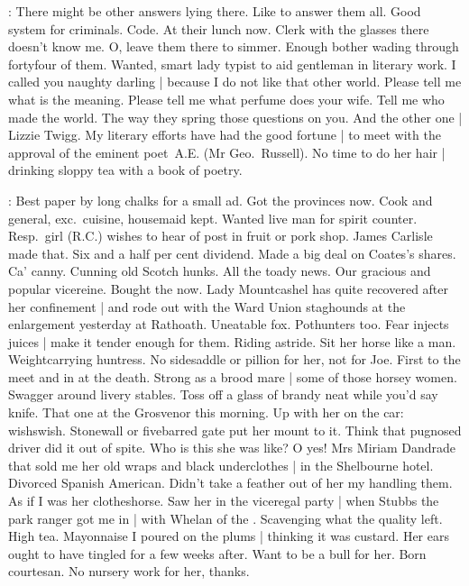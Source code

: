 \BloomInt:
There might be other answers lying there.
Like to answer them all.
Good system for criminals.
Code.
At their lunch now.
Clerk with the glasses there doesn't know me.
O, leave them there to simmer.
Enough bother wading through fortyfour of them.
Wanted,
smart lady typist to aid gentleman in literary work.
I called you naughty darling |
because I do not like that other world.
Please tell me what is the meaning.
Please tell me what perfume does your wife.
Tell me who made the world.
The way they spring those questions on you.
And the other one |
Lizzie Twigg.
My literary efforts have had the good fortune |
to meet with the approval of the eminent poet~A.E.
(Mr Geo.\ Russell).
No time to do her hair |
drinking sloppy tea with a book of poetry.

\BloomInt:
Best paper by long chalks for a small ad.
Got the provinces now.
Cook and general,
exc.\ cuisine,
housemaid kept.
Wanted live man for spirit counter.
Resp.\ girl (R.C.) wishes to hear of post in fruit or pork shop.
James Carlisle made that.
Six and a half per cent dividend.
Made a big deal on Coates's shares.
Ca' canny.
Cunning old Scotch hunks.
All the toady news.
Our gracious and popular vicereine.
Bought the  now.
Lady Mountcashel has quite recovered after her confinement |
and rode out with the Ward Union staghounds
at the enlargement yesterday at Rathoath.
Uneatable fox.
Pothunters too.
Fear injects juices |
make it tender enough for them.
Riding astride.
Sit her horse like a man.
Weightcarrying huntress.
No sidesaddle or pillion for her,
not for Joe.
First to the meet and in at the death.
Strong as a brood mare |
some of those horsey women.
Swagger around livery stables.
Toss off a glass of brandy neat while you'd say knife.
That one at the Grosvenor this morning.
Up with her on the car:
wishswish.
Stonewall or fivebarred gate put her mount to it.
Think that pugnosed driver did it out of spite.
Who is this she was like?
O yes!
Mrs Miriam Dandrade that sold me
her old wraps and black underclothes |
in the Shelbourne hotel.
Divorced Spanish American.
Didn't take a feather out of her my handling them.
As if I was her clotheshorse.
Saw her in the viceregal party |
when Stubbs the park ranger got me in |
with Whelan of the .
Scavenging what the quality left.
High tea.
Mayonnaise I poured on the plums |
thinking it was custard.
Her ears ought to have tingled for a few weeks after.
Want to be a bull for her.
Born courtesan.
No nursery work for her, thanks.

